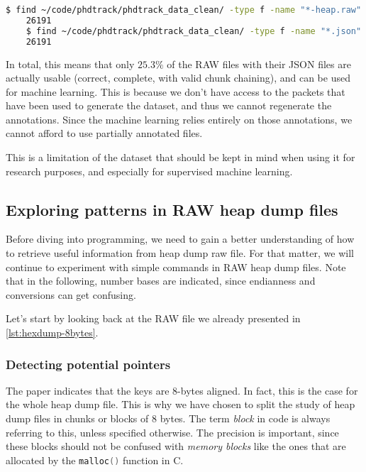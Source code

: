     \begin{lstlisting}[language=bash, caption={Command and logs of counting the number of RAW files in the cleaned dataset.}]
    $ find ~/code/phdtrack/phdtrack_data_clean/ -type f -name "*-heap.raw" | wc -l
    26191
    $ find ~/code/phdtrack/phdtrack_data_clean/ -type f -name "*.json" | wc -l
    26191
    \end{lstlisting}

    In total, this means that only $25.3\% $ of the RAW files with their JSON files are actually usable (correct, complete, with valid chunk chaining), and can be used for machine learning. This is because we don't have access to the packets that have been used to generate the dataset, and thus we cannot regenerate the annotations. Since the machine learning relies entirely on those annotations, we cannot afford to use partially annotated files. 
    
    This is a limitation of the dataset that should be kept in mind when using it for research purposes, and especially for supervised machine learning.

    \subsection{Exploring patterns in RAW heap dump files}
    Before diving into programming, we need to gain a better understanding of how to retrieve useful information from heap dump raw file. For that matter, we will continue to experiment with simple commands in RAW heap dump files. Note that in the following, number bases are indicated, since endianness and conversions can get confusing.

    Let's start by looking back at the RAW file we already presented in \ref{lst:hexdump-8bytes}.

    \subsubsection{Detecting potential pointers}
    The paper  indicates that the keys are 8-bytes aligned. In fact, this is the case for the whole heap dump file. This is why we have chosen to split the study of heap dump files in chunks or blocks of 8 bytes. The term \textit{block} in code is always referring to this, unless specified otherwise. The precision is important, since these blocks should not be confused with \textit{memory blocks} like the ones that are allocated by the \lstinline[language=c]|malloc()| function in C.

